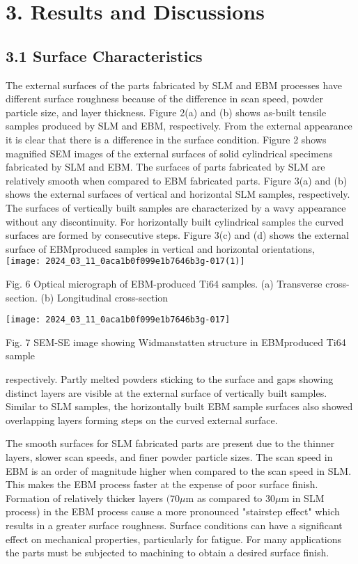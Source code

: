 \documentclass[10pt]{article}
\begin{document}
\section*{3. Results and Discussions}
\subsection*{3.1 Surface Characteristics}
The external surfaces of the parts fabricated by SLM and EBM processes have different surface roughness because of the difference in scan speed, powder particle size, and layer thickness. Figure 2(a) and (b) shows as-built tensile samples produced by SLM and EBM, respectively. From the external appearance it is clear that there is a difference in the surface condition. Figure 2 shows magnified SEM images of the external surfaces of solid cylindrical specimens fabricated by SLM and EBM. The surfaces of parts fabricated by SLM are relatively smooth when compared to EBM fabricated parts. Figure 3(a) and (b) shows the external surfaces of vertical and horizontal SLM samples, respectively. The surfaces of vertically built samples are characterized by a wavy appearance without any discontinuity. For horizontally built cylindrical samples the curved surfaces are formed by consecutive steps. Figure 3(c) and (d) shows the external surface of EBMproduced samples in vertical and horizontal orientations,\\
\texttt{[image: 2024\_03\_11\_0aca1b0f099e1b7646b3g-017(1)]}

Fig. 6 Optical micrograph of EBM-produced Ti64 samples. (a) Transverse cross-section. (b) Longitudinal cross-section

\begin{center}
\texttt{[image: 2024\_03\_11\_0aca1b0f099e1b7646b3g-017]}
\end{center}

Fig. 7 SEM-SE image showing Widmanstatten structure in EBMproduced Ti64 sample

respectively. Partly melted powders sticking to the surface and gaps showing distinct layers are visible at the external surface of vertically built samples. Similar to SLM samples, the horizontally built EBM sample surfaces also showed overlapping layers forming steps on the curved external surface.

The smooth surfaces for SLM fabricated parts are present due to the thinner layers, slower scan speeds, and finer powder particle sizes. The scan speed in EBM is an order of magnitude higher when compared to the scan speed in SLM. This makes the EBM process faster at the expense of poor surface finish. Formation of relatively thicker layers $(70 \mu \mathrm{m}$ as compared to $30 \mu \mathrm{m}$ in SLM process) in the EBM process cause a more pronounced "stairstep effect" which results in a greater surface roughness. Surface conditions can have a significant effect on mechanical properties, particularly for fatigue. For many applications the parts must be subjected to machining to obtain a desired surface finish.
\end{document}
